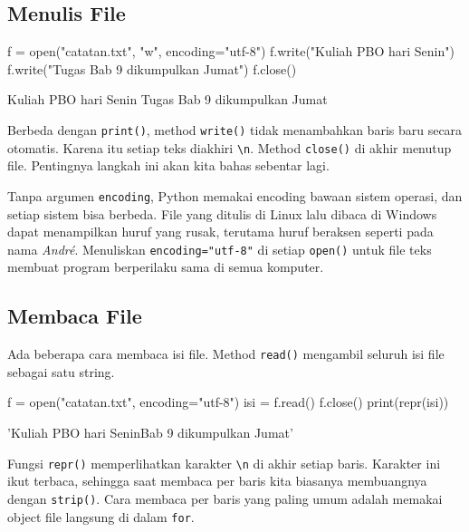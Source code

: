 \subsection{Menulis File}

\begin{kode}
f = open("catatan.txt", "w", encoding="utf-8")
f.write("Kuliah PBO hari Senin\n")
f.write("Tugas Bab 9 dikumpulkan Jumat\n")
f.close()
\end{kode}

\begin{keluaran}
Kuliah PBO hari Senin
Tugas Bab 9 dikumpulkan Jumat
\end{keluaran}

Berbeda dengan \texttt{print()}, method \texttt{write()} tidak menambahkan baris baru secara otomatis. Karena itu setiap teks diakhiri \texttt{\textbackslash n}. Method \texttt{close()} di akhir menutup file. Pentingnya langkah ini akan kita bahas sebentar lagi.

\begin{penting}[Selalu Tuliskan \texttt{encoding="utf-8"}]
Tanpa argumen \texttt{encoding}, Python memakai encoding bawaan sistem operasi, dan setiap sistem bisa berbeda. File yang ditulis di Linux lalu dibaca di Windows dapat menampilkan huruf yang rusak, terutama huruf beraksen seperti pada nama \emph{Andr\'e}. Menuliskan \texttt{encoding="utf-8"} di setiap \texttt{open()} untuk file teks membuat program berperilaku sama di semua komputer.
\end{penting}

\subsection{Membaca File}

Ada beberapa cara membaca isi file. Method \texttt{read()} mengambil seluruh isi file sebagai satu string.

\begin{kode}
f = open("catatan.txt", encoding="utf-8")
isi = f.read()
f.close()
print(repr(isi))
\end{kode}

\begin{keluaran}
'Kuliah PBO hari Senin\nTugas Bab 9 dikumpulkan Jumat\n'
\end{keluaran}

Fungsi \texttt{repr()} memperlihatkan karakter \texttt{\textbackslash n} di akhir setiap baris. Karakter ini ikut terbaca, sehingga saat membaca per baris kita biasanya membuangnya dengan \texttt{strip()}. Cara membaca per baris yang paling umum adalah memakai object file langsung di dalam \texttt{for}.

